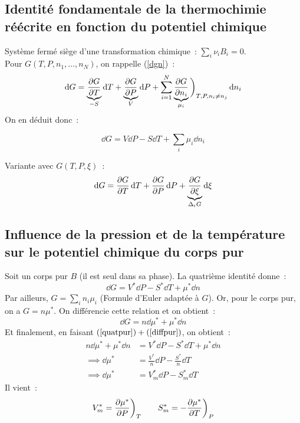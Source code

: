 \documentclass{article}
\let\oldref\ref
\renewcommand{\ref}[1]{(\oldref{#1})}
\newcommand{\Dr}{\Delta_{\mathrm{r}}}
\begin{document}
\subsection{Identité fondamentale de la thermochimie réécrite en fonction du potentiel chimique}
\begin{tableau}
    Système fermé siège d'une transformation chimique~: $\sum_i \nu_i B_i = 0$.\\
    Pour $G(T,P,n_1,\dots,n_N)$, on rappelle \ref{dgn}~:
    \begin{equation*}
        \dd{G} = \underbrace{\pdv{G}{T}}_{-S}\dd{T} + \underbrace{\pdv{G}{P}}_{V}\dd{P} + \sum_{i=1}^N \underbrace{\pdv{G}{n_i}}_{\mu_i}\bigg)_{T,P,n_i\neq n_j}\dd{n_i}
    \end{equation*}
    On en déduit donc~:
    \begin{enonce}
        $$\dd{G} = V\dd{P} - S\dd{T} + \sum_i \mu_i\dd{n_i}$$
    \end{enonce}
    \tcbline
    Variante avec $G(T,P,\xi)$~:
    \begin{equation*}
        \dd{G} = \pdv{G}{T}\dd{T} + \pdv{G}{P}\dd{P} + \underbrace{\pdv{G}{\xi}}_{\Dr G}\dd{\xi}
    \end{equation*}
\end{tableau}

\subsection{Influence de la pression et de la température sur le potentiel chimique du corps pur}
Soit un corps pur $B$ (il est seul dans sa phase). La quatrième identité donne~:
\begin{equation}\label{quatpur}
    \dd{G} = V^*\dd{P} - S^*\dd{T} + \mu^*\dd{n}
\end{equation}
Par ailleurs, $G= \sum_i n_i \mu_i$ (Formule d'Euler adaptée à $G$). Or, pour le corps pur, on a $G=n\mu^*$. On différencie cette relation et on obtient~:
\begin{equation}\label{diffpur}
    \dd{G} = n\dd{\mu^*} + \mu^*\dd{n}
\end{equation}
Et finalement, en faisant $\ref{quatpur} + \ref{diffpur}$, on obtient~:
\begin{align*}
    n\dd{\mu^*} + \mu^* \dd{n} &= V^* \dd{P} - S^* \dd{T} + \mu^* \dd{n}\\
    \implies \dd{\mu^*} &= \frac{V^*}{n} \dd{P} - \frac{S^*}{n}\dd{T}\\
    \implies \dd{\mu^*} &= V_m^* \dd{P} - S_m^*\dd{T}
\end{align*}
Il vient~:
$$V_m^* = \pdv{\mu^*}{P}\bigg)_T\qquad S_m^* = -\pdv{\mu^*}{T}\bigg)_P$$
\end{document}
